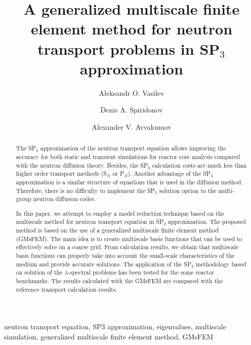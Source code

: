 \documentclass[authoryear]{elsarticle}
\begin{document}
\begin{frontmatter}
\title{A generalized multiscale finite element method for neutron transport problems in SP$_3$ approximation}

\author[nefu]{Aleksandr O. Vasilev}

\author[nefu]{Denis A. Spiridonov}

\author[ki]{Alexander V. Avvakumov}

\address[nefu]{North-Eastern Federal University, 58, Belinskogo, Yakutsk, Russia}
\address[ki]{National Research Center \emph{Kurchatov Institute},  1, Sq. Academician Kurchatov, Moscow, Russia}


\begin{abstract}
The SP$_3$ approximation of the neutron transport equation allows improving the accuracy for both static and transient simulations for reactor core analysis compared with the neutron diffusion theory. 
Besides, the SP$_3$ calculation costs are much less than higher order transport methods (S$_N$ or P$_N$).
Another advantage of the SP$_3$ approximation is a similar structure of equations that is used in the diffusion method. 
Therefore, there is no difficulty to implement the SP$_3$ solution option to the multi-group neutron diffusion codes. 

In this paper, we attempt to employ a model reduction technique based on the multiscale method for neutron transport equation in SP$_3$ approximation. 
The proposed method is based on the use of a generalized multiscale finite element method (GMsFEM).
The main idea is to create multiscale basis functions that can be used to effectively solve on a coarse grid.
From calculation results, we obtain that multiscale basis functions can properly take into account the small-scale characteristics of the medium and provide accurate solutions. 
The application of the SP$_3$ methodology based on solution of the $\lambda$-spectral problems has been tested for the some reactor benchmarks.
The results calculated with the GMsFEM are compared with the reference transport calculation results.
\end{abstract}

\begin{keyword}
neutron transport equation, SP3 approximation, eigenvalues, multiscale simulation, generalized multiscale finite element method, GMsFEM
\end{keyword}

\end{frontmatter}
\end{document}

